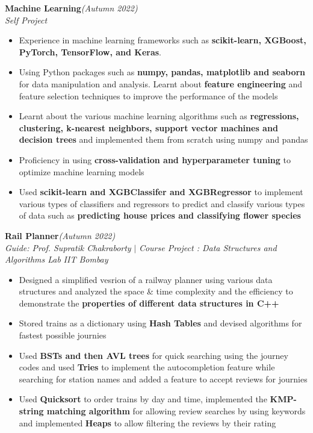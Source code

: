 \documentclass[a4paper,10pt]{article}
\begin{document}
\pagebreak
\vspace{\baselineskip}
\vspace{-20pt}
\noindent\textbf{\large Machine Learning}\hfill{\sl \small (Autumn 2022)}\\
{\it Self Project}
\\\vspace{-15pt}
\begin{itemize}[itemsep = -0.65 mm, leftmargin=*]
    \item Experience in machine learning frameworks such as \textbf{scikit-learn, XGBoost, PyTorch, TensorFlow, and Keras}.
    \item Using Python packages such as \textbf{numpy, pandas, matplotlib and seaborn} for data manipulation and analysis. Learnt about \textbf{feature engineering} and feature selection techniques to improve the performance of the models
    \item Learnt about the various machine learning algorithms such as \textbf{regressions, clustering, k-nearest neighbors, support vector machines and decision trees} and implemented them from scratch using numpy and pandas
    \item Proficiency in using \textbf{cross-validation and hyperparameter tuning} to optimize machine learning models
    \item Used \textbf{scikit-learn and XGBClassifer and XGBRegressor} to implement various types of classifiers and regressors to predict and classify various types of data such as \textbf{predicting house prices and classifying flower species}
\end{itemize}
\vspace{\baselineskip}
\vspace{-15pt}
\noindent\textbf{\large Rail Planner}\hfill{\sl \small (Autumn 2022)}\\
{\it Guide: Prof. Supratik Chakraborty} $|$ {\it Course Project : Data Structures and Algorithms Lab} \hfill{\it IIT Bombay}
\\\vspace{-15pt}
\begin{itemize}[itemsep = -0.65 mm, leftmargin=*]
    \item Designed a simplified vesrion of a railway planner using various data structures and analyzed the space \& time complexity and the efficiency to demonstrate the \textbf{properties of different data structures in C++}
    \item Stored trains as a dictionary using \textbf{Hash Tables} and devised algorithms for fastest possible journies
    \item Used \textbf{BSTs and then AVL trees} for quick searching using the journey codes and used \textbf{Tries} to implement the autocompletion feature while searching for station names and added a feature to accept reviews for journies
    \item Used \textbf{Quicksort} to order trains by day and time, implemented the \textbf{KMP-string matching algorithm} for allowing review searches by using keywords and implemented \textbf{Heaps} to allow filtering the reviews by their rating
\end{itemize}
\end{document}
